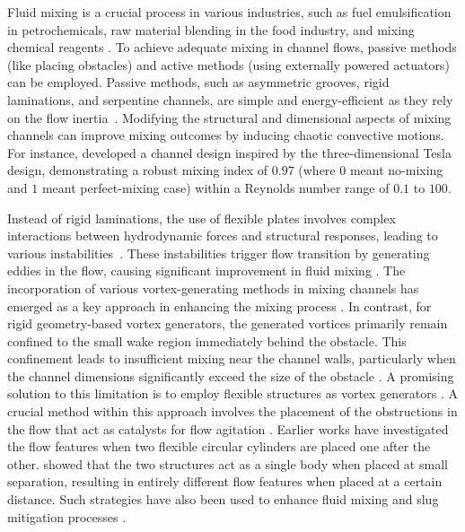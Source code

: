 \documentclass[reprint,a4paper,fleqn]{cas-dc} %
\begin{document}
	
	Fluid mixing is a crucial process in various industries, such as fuel emulsification in petrochemicals, raw material blending in the food industry, and mixing chemical reagents \citep{Yeh2015, Nunez-Flores2020, Peterwitz2021,Wang2021}. To achieve adequate mixing in channel flows, passive methods (like placing obstacles) and active methods (using externally powered actuators) can be employed. Passive methods, such as asymmetric grooves, rigid laminations, and serpentine channels, are simple and energy-efficient as they rely on the flow inertia~\citep{Nguyen2005, Yang_2008, Afzal_2014, Kashid2011, Kang2015,Derksen2010}. Modifying the structural and dimensional aspects of mixing channels can improve mixing outcomes by inducing chaotic convective motions. For instance, \cite{Yang2015} developed a channel design inspired by the three-dimensional Tesla design, demonstrating a robust mixing index of $0.97$ (where $0$ meant no-mixing and $1$ meant perfect-mixing case) within a Reynolds number range of $0.1$ to $100$.
	
	
	Instead of rigid laminations, the use of flexible plates involves complex interactions between hydrodynamic forces and structural responses, leading to various instabilities~\citep{ Eloy2008, Zhang2000,Taneda1968, Watanabe2002, Alben2008}. These instabilities trigger flow transition by generating eddies in the flow, causing significant improvement in fluid mixing \citep{Self2019,Aaron2019,Self2024}. The incorporation of various vortex-generating methods in mixing channels has emerged as a key approach in enhancing the mixing process \citep{Ali2015,Khatavkar2007,Dadvand2019,Ali2016,Hosseini2021,Ali_2017,Fuchs2011,Derksen2010, Fuchs2015}. In contrast, for rigid geometry-based vortex generators, the generated vortices primarily remain confined to the small wake region immediately behind the obstacle. This confinement leads to insufficient mixing near the channel walls, particularly when the channel dimensions significantly exceed the size of the obstacle \citep{Wang2020}. A promising solution to this limitation is to employ flexible structures as vortex generators \citep{Hsiao2014,Park2019,Saleh2019,Zhao2020,Chen2020,Nazari_2020,Self_JFS_2024,kakroo2024}.
	A crucial method within this approach involves the placement of the obstructions in the flow that act as catalysts for flow agitation \citep{Abdelhamid2021,Yadav2021,Jing2022,Yu2017}. Earlier works \citep{Huarte2011, Borazjani2009, Wang2017} have investigated the flow features when two flexible circular cylinders are placed one after the other. \cite{Wang2017} showed that the two structures act as a single body when placed at small separation, resulting in entirely different flow features when placed at a certain distance. Such strategies have also been used to enhance fluid mixing \citep{Ward2015} and slug mitigation processes \citep{Mehendale2018}.
	
\end{document}
